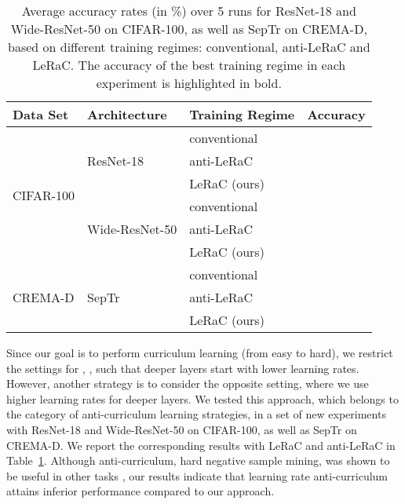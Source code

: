 \documentclass[10pt,twocolumn,letterpaper]{article}
\begin{document}
\begin{table}[t]
  \small{
  \setlength\tabcolsep{3.3pt}
  \begin{center}
  \begin{tabular}{lllc}
    \toprule
    Data Set & Architecture  & Training Regime     & Accuracy \\
    \midrule
    \multirow{6}{*}{\vspace{-0.15cm}CIFAR-100}  &               & conventional             &  \\
                                & ResNet-18     & anti-LeRaC             & \\
                                &               & LeRaC (ours)              & \\
    \cmidrule{2-4}
    &               & conventional             &  \\
                       & Wide-ResNet-50     & anti-LeRaC             & \\
                                &               & LeRaC (ours)              & \\
    \midrule
    &      & conventional                   &        \\
    CREMA-D & SepTr     & anti-LeRaC                &       \\
    &     & LeRaC (ours)                    &    \\
    \bottomrule
  \end{tabular}
    \end{center}
    }
      \vspace{-0.6cm}
    \caption{Average accuracy rates (in \%) over 5 runs for ResNet-18 and Wide-ResNet-50 on CIFAR-100, as well as SepTr on CREMA-D, based on different training regimes: conventional, anti-LeRaC and LeRaC. The accuracy of the best training regime in each experiment is highlighted in bold.}
  \label{tab_anti}
\end{table}

Since our goal is to perform curriculum learning (from easy to hard), we restrict the settings for , , such that deeper layers start with lower learning rates. However, another strategy is to consider the opposite setting, where we use higher learning rates for deeper layers. We tested this approach, which belongs to the category of anti-curriculum learning strategies, in a set of new experiments with ResNet-18 and Wide-ResNet-50 on CIFAR-100, as well as SepTr on CREMA-D. We report the corresponding results with LeRaC and anti-LeRaC in Table~\ref{tab_anti}. Although anti-curriculum, \eg hard negative sample mining, was shown to be useful in other tasks \cite{Soviany-IJCV-2022}, our results indicate that learning rate anti-curriculum attains inferior performance compared to our approach. 
\end{document}
